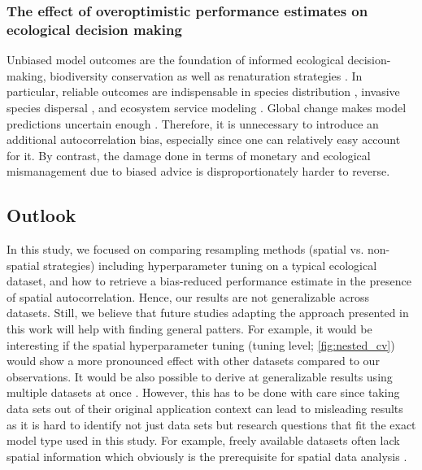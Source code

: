 \documentclass[review]{elsarticle}
\begin{document}
\subsubsection{The effect of overoptimistic performance estimates on ecological decision making}
\noindent Unbiased model outcomes are the foundation of informed ecological decision-making, biodiversity conservation as well as renaturation strategies \citep{muenchowReviewEcologicalGradient2018}.
In particular, reliable outcomes are indispensable in species distribution \citep{loehleDisequilibriumRelaxationTimes2018}, invasive species dispersal \citep{srivastavaMappingInvasionPotential2018}, and ecosystem service modeling \citep{watanabeDynamicEmergyAccounting2014}.
Global change makes model predictions uncertain enough \citep{ipccSummaryPolicymakers2013}.
Therefore, it is unnecessary to introduce an additional autocorrelation bias, especially since one can relatively easy account for it.
By contrast, the damage done in terms of monetary and ecological mismanagement due to biased advice is disproportionately harder to reverse.

\subsection{Outlook}

In this study, we focused on comparing resampling methods (spatial vs. non-spatial strategies) including hyperparameter tuning on a typical ecological dataset, and how to retrieve a bias-reduced performance estimate in the presence of spatial autocorrelation.
Hence, our results are not generalizable across datasets.
Still, we believe that future studies adapting the approach presented in this work will help with finding general patters.
For example, it would be interesting if the spatial hyperparameter tuning (tuning level; \autoref{fig:nested_cv}) would show a more pronounced effect with other datasets compared to our observations.
It would be also possible to derive at generalizable results using multiple datasets at once \citep{wikleCommonTaskFramework2017}.
However, this has to be done with care since taking data sets out of their original application context can lead to misleading results as it is hard to identify not just data sets but research questions that fit the exact model type used in this study.
For example, freely available datasets often lack spatial information which obviously is the prerequisite for spatial data analysis \citep{olsonPMLBLargeBenchmark2017, vanschorenOpenMLNetworkedScience2014}.
\end{document}
